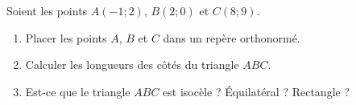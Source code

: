 
\begin{exercice}\label{exosmath-0508}

    Soient les points \( A(-1;2)\), \( B(2;0)\) et \( C(8;9)\).
    \begin{enumerate}
        \item
            Placer les points \( A\), \( B\) et \( C\) dans un repère orthonormé.
        \item
            Calculer les longueurs des côtés du triangle \( ABC\).
        \item
            Est-ce que le triangle \( ABC\) est isocèle ? Équilatéral ? Rectangle ?
    \end{enumerate}

\end{exercice}
